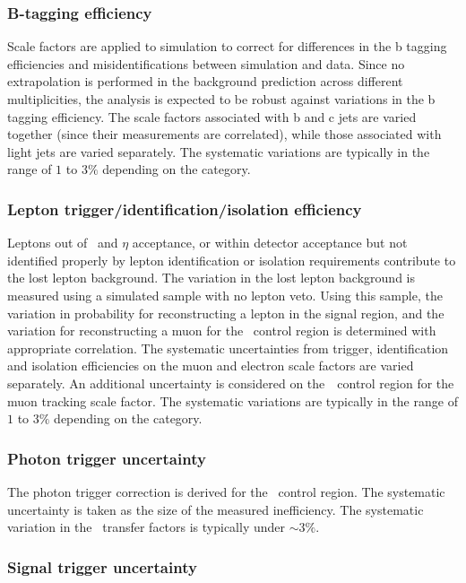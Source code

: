 \subsubsection{B-tagging efficiency}

Scale factors are applied to simulation to correct for differences in the 
b tagging efficiencies and misidentifications between simulation and data. 
Since no extrapolation is performed in the background prediction across different 
\nb multiplicities, the analysis is expected to be robust against variations in the 
b tagging efficiency. The scale factors associated with b and c jets are varied together 
(since their measurements are correlated), while those associated with light jets are varied separately.
The systematic variations are typically in the range of $1$ to $3\%$ depending on the category.

\subsubsection{Lepton trigger/identification/isolation efficiency}

Leptons out of \pt~and $\eta$ acceptance, or within detector
acceptance but not identified properly by lepton identification or isolation
requirements contribute to the lost lepton background. The variation 
in the lost lepton background is measured using a simulated sample with no lepton veto.
Using this sample, the variation in probability for reconstructing a lepton in the signal region,
and the variation for reconstructing a muon for the \mj~control region is determined with 
appropriate correlation. The systematic uncertainties from trigger, identification and 
isolation efficiencies on the muon and electron scale factors are varied separately. 
An additional uncertainty is considered on the~\mj~control region for the muon tracking
scale factor. The systematic variations are typically in the range of $1$ to $3\%$ depending on the category.

\subsubsection{Photon trigger uncertainty}
The photon trigger correction is derived for the \gj~control region. The systematic uncertainty is
taken as the size of the measured inefficiency. The systematic variation in the \gj~transfer factors 
is typically under $\sim3\%$.

\subsubsection{Signal trigger uncertainty}

